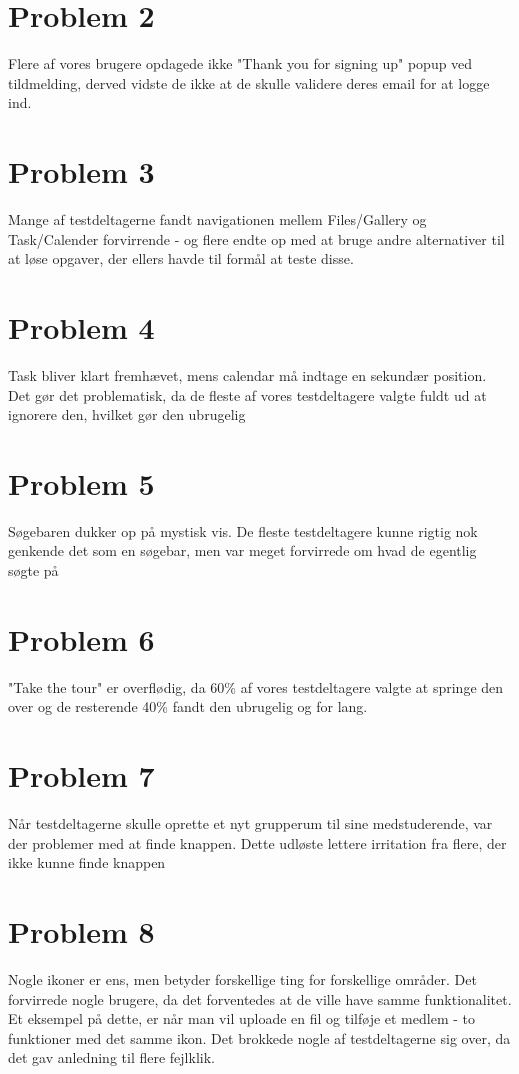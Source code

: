 \documentclass[12pt]{article}
\begin{document}
\section*{Problem 2}
Flere af vores brugere opdagede ikke "Thank you for signing up" popup ved tildmelding, derved vidste de ikke at de skulle validere deres email for at logge ind.
\newpage
\section*{Problem 3}
Mange af testdeltagerne fandt navigationen mellem Files/Gallery og Task/Calender
forvirrende - og flere endte op med at bruge andre alternativer til at løse opgaver,
der ellers havde til formål at teste disse.
\newpage
\section*{Problem 4}
Task bliver klart fremhævet, mens calendar må
indtage en sekundær position. Det gør det problematisk, da de fleste af vores
testdeltagere valgte fuldt ud at ignorere den, hvilket gør den ubrugelig
\newpage
\section*{Problem 5}
Søgebaren dukker op på mystisk vis. De fleste testdeltagere
kunne rigtig nok genkende det som en søgebar, men var meget forvirrede om hvad
de egentlig søgte på
\newpage
\section*{Problem 6}
"Take the tour" er overflødig, da 60\% af vores testdeltagere valgte at springe den over og de resterende 40\% fandt den ubrugelig og for lang.
\newpage
\section*{Problem 7}
Når testdeltagerne skulle oprette et nyt grupperum til sine medstuderende, var
der problemer med at finde knappen. Dette udløste lettere irritation fra flere, der
ikke kunne finde knappen
\newpage
\section*{Problem 8}
Nogle ikoner er ens, men betyder forskellige ting for forskellige områder. Det
forvirrede nogle brugere, da det forventedes at de ville have samme funktionalitet.
Et eksempel på dette, er når man vil uploade en
fil og tilføje et medlem - to funktioner med det samme ikon. Det brokkede nogle af
testdeltagerne sig over, da det gav anledning til flere fejlklik.
\newpage
\end{document}
